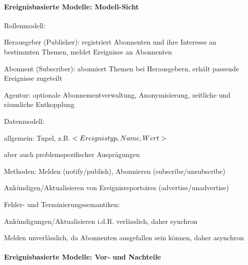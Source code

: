 \documentclass[10pt]{article}
\begin{document}
\paragraph{Ereignisbasierte Modelle: Modell-Sicht}

\begin{itemize*}
  \item Rollenmodell:
  \begin{itemize*}
    \item Herausgeber (Publisher): registriert Abonnenten und ihre Interesse an bestimmten Themen, meldet Ereignisse an Abonnenten
    \item Abonnent (Subscriber): abonniert Themen bei Herausgebern, erhält passende Ereignisse zugeteilt
    \item Agentur: optionale Abonnementverwaltung, Anonymisierung, zeitliche und räumliche Entkopplung
  \end{itemize*}
  \item Datenmodell:
  \begin{itemize*}
    \item allgemein: Tupel, z.B. $<Ereignistyp,\space Name,\space Wert>$
    \item aber auch problemspezifischer Ausprägungen
    \item Methoden: Melden (notify/publish), Abonnieren (subscribe/unsubscribe)
    \item Ankündigen/Aktualisieren von Ereignisreportoires (advertise/unadvertise)
  \end{itemize*}
  \item Fehler- und Terminierungssemantiken:
  \begin{itemize*}
    \item Ankündigungen/Aktualisieren i.d.R. verlässlich, daher synchron
    \item Melden unverlässlich, da Abonnenten ausgefallen sein können, daher asynchron
  \end{itemize*}
\end{itemize*}

\paragraph{Ereignisbasierte Modelle: Vor- und Nachteile}
\end{document}
